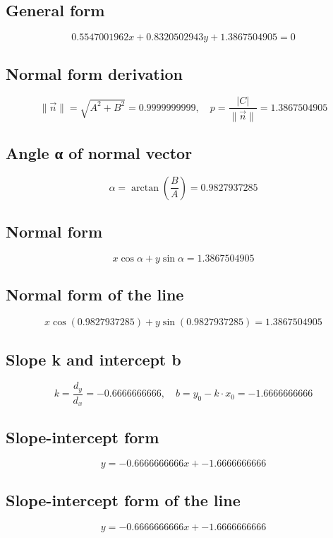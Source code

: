 \documentclass{article}
\begin{document}
\subsection*{ \vspace{1em} General form}
\[
0.5547001962x + 0.8320502943y + 1.3867504905 = 0
\]
\subsection*{ \vspace{1em} Normal form derivation}
\[
\|\vec{n}\| = \sqrt{A^2 + B^2} = 0.9999999999,\quad p = \frac{|C|}{\|\vec{n}\|} = 1.3867504905
\]
\subsection*{ \vspace{1em} Angle α of normal vector}
\[
\alpha = \arctan{\left(\frac{B}{A}\right)} = 0.9827937285
\]
\subsection*{ \vspace{1em} Normal form}
\[
x \cos\alpha + y \sin\alpha = 1.3867504905
\]
\subsection*{ \vspace{1em} Normal form of the line}
\[
x\cos(0.9827937285) + y\sin(0.9827937285) = 1.3867504905
\]
\subsection*{ \vspace{1em} Slope k and intercept b}
\[
k = \frac{d_y}{d_x} = -0.6666666666,\quad b = y_0 - k \cdot x_0 = -1.6666666666
\]
\subsection*{ \vspace{1em} Slope-intercept form}
\[
y = -0.6666666666x + -1.6666666666
\]
\subsection*{ \vspace{1em} Slope-intercept form of the line}
\[
y = -0.6666666666x + -1.6666666666
\]
\bigskip

\hrulefill
\bigskip
\end{document}
